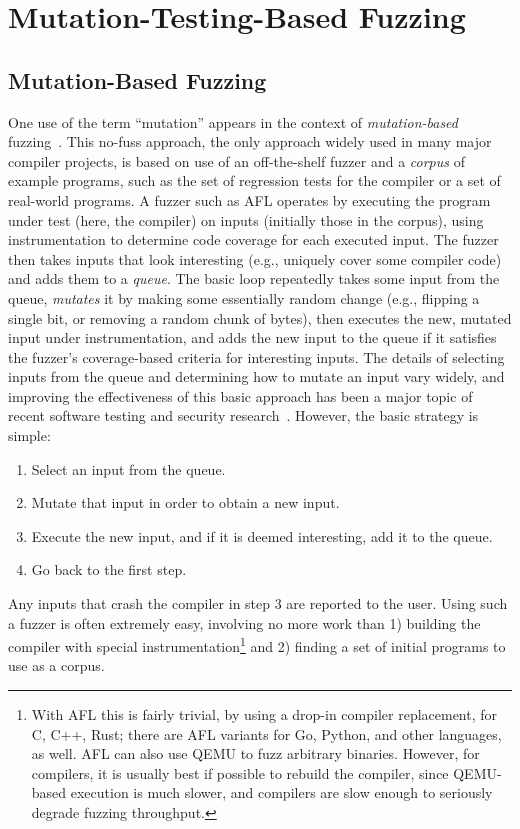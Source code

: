 \section{Mutation-Testing-Based Fuzzing}



\subsection{Mutation-Based Fuzzing}

One use of the term ``mutation'' appears in the context of \emph{mutation-based} fuzzing~\cite{ArtFuzz}.  This no-fuss approach,  the only approach widely used in many major compiler projects, is based on use of an off-the-shelf fuzzer and a \emph{corpus} of example programs, such as the set of regression tests for the compiler or a set of real-world programs.  A fuzzer such as AFL operates by executing the program under test (here, the compiler) on inputs (initially those in the corpus), using instrumentation to determine code coverage for each executed input.  The fuzzer then takes inputs that look interesting (e.g., uniquely cover some compiler code) and adds them to a \emph{queue}.  The basic loop repeatedly takes some input from the queue, \emph{mutates} it by making some essentially random change (e.g., flipping a single bit, or removing a random chunk of bytes), then executes the new, mutated input under instrumentation, and adds the new input to the queue if it satisfies the fuzzer's coverage-based criteria for interesting inputs.  The details of selecting inputs from the queue and determining how to mutate an input vary widely, and improving the effectiveness of this basic approach has been a major topic of recent software testing and security research~\cite{evalfuzz,BoehmeCR21,ArtFuzz}.  However, the basic strategy is simple:

\begin{enumerate}
\item Select an input from the queue.
\item Mutate that input in order to obtain a new input.
\item Execute the new input, and if it is deemed interesting, add it to the queue.
\item Go back to the first step.
\end{enumerate}

Any inputs that crash the compiler in step 3 are reported to the user.  Using such a fuzzer is often extremely easy, involving no more work than 1) building the compiler with special instrumentation\footnote{With AFL this is fairly trivial, by using a drop-in compiler replacement, for C, C++, Rust; there are AFL variants for Go, Python, and other languages, as well.  AFL can also use QEMU to fuzz arbitrary binaries.  However, for compilers, it is usually best if possible to rebuild the compiler, since QEMU-based execution is much slower, and compilers are slow enough to seriously degrade fuzzing throughput.} and 2) finding a set of initial programs to use as a corpus.  


